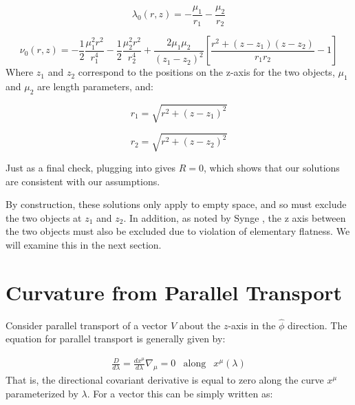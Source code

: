 \documentclass{article}
\begin{document}
\begin{equation}
\lambda_0(r,z)=-\frac{\mu_1}{r_1}-\frac{\mu_2}{r_2}
\label{eq:lambda-0}
\end{equation}

\begin{equation}
	\label{eq:nu-0}
	\nu_0(r,z)=-\frac{1}{2}\frac{\mu_{1}^{2}r^2}{r_{1}^{4}}-\frac{1}{2}\frac{\mu_{2}^{2}r^2}{r_{2}^{4}}+\frac{2\mu_1\mu_2}{(z_1-z_2)^2}\left[\frac{r^2+(z-z_1)(z-z_2)}{r_{1}r_{2}}-1\right]
\end{equation}
Where $z_1$ and $z_2$ correspond to the positions on the z-axis for the two objects, $\mu_1$ and $\mu_2$ are length parameters, and:

\begin{equation}
r_1=\sqrt{r^2+(z-z_1)^2}
\label{eq:r_1}
\end{equation}

\begin{equation}
r_2=\sqrt{r^2+(z-z_2)^2}
\label{eq:r_2}
\end{equation}

Just as a final check, plugging  into  gives $R=0$, which shows that our solutions are consistent with our assumptions.

By construction, these solutions only apply to empty space, and so must exclude the two objects at $z_1$ and $z_2$. In addition, as noted by Synge \cite{synge_relativity}, the z axis between the two objects must also be excluded due to violation of elementary flatness. We will examine this in the next section.

\section{Curvature from Parallel Transport}

Consider parallel transport of a vector $V$ about the $z$-axis in
the $\hat{\phi}$ direction. The equation for parallel transport is generally given by:
  	
\begin{equation}
\begin{array}{rcl} \frac{D}{d\lambda}=\frac{dx^{\mu}}{d\lambda}\nabla_{\mu}=0 & \mbox{along} & x^{\mu}\left(\lambda\right)	  	
\end{array}
\end{equation}	  	
That is, the directional covariant derivative is equal to zero along
the curve $x^{\mu}$ parameterized by $\lambda$. For a vector this can
be simply written as:
\end{document}
